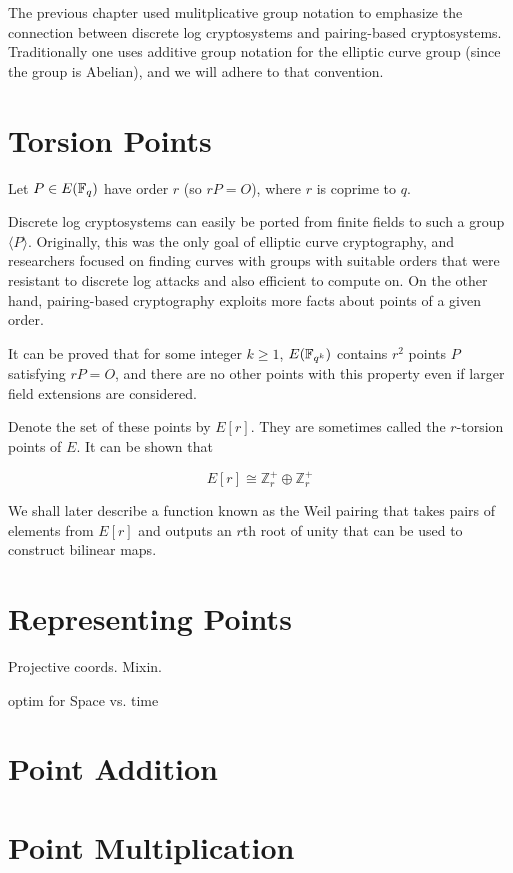 The previous chapter used mulitplicative group notation to emphasize
the connection
between discrete log cryptosystems and pairing-based cryptosystems.
Traditionally one uses additive group notation for the elliptic curve group
(since the group is Abelian), and we will adhere to that convention.

\section {Torsion Points}

Let $P\in E(\mathbb{F}_q)$ have order $r$ (so $r P = O$),
where $r$ is coprime to $q$.

Discrete log cryptosystems can easily be ported from finite fields
to such a group $\langle P \rangle$.
Originally, this was the only goal of elliptic curve cryptography,
and researchers focused on finding curves with groups with
suitable orders that were resistant to discrete log attacks and also
efficient to compute on.
On the other hand, pairing-based cryptography exploits more facts
about points of a given order.

It can be proved that for some integer $k \ge 1$,
$E(\mathbb{F}_{q^k})$ contains $r^2$ points $P$ satisfying $r P = O$,
and there are no other points with this property even if larger field
extensions are considered.

Denote the set of these points by $E[r]$. They are sometimes called the
$r$-torsion points of $E$. It can be shown that

\[ E[r] \cong \mathbb{Z}_r^+ \oplus \mathbb{Z}_r^+ \]

We shall later describe a function known as the Weil pairing
that takes pairs of elements from $E[r]$ and outputs an $r$th root of unity
that can be used to construct bilinear maps.

\section {Representing Points}

Projective coords. Mixin.

optim for Space vs. time

\section {Point Addition}

\section {Point Multiplication}

